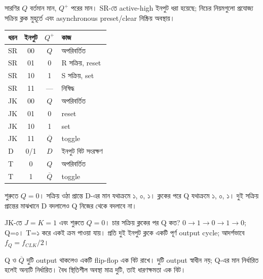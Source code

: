 সারণির $Q$ বর্তমান মান, $Q^+$ পরের মান। SR-তে active-high ইনপুট ধরা হয়েছে; নিচের নিয়মগুলো প্রযোজ্য সক্রিয় ক্লক মুহূর্তে এবং asynchronous preset/clear নিষ্ক্রিয় অবস্থায়।
\begin{center}\begin{tabularx}{\linewidth}{|l|c|c|Y|}\hline
ধরন & ইনপুট & $Q^+$ & কাজ\\\hline
SR & 00 & $Q$ & অপরিবর্তিত\\\hline
SR & 01 & 0 & R সক্রিয়, reset\\\hline
SR & 10 & 1 & S সক্রিয়, set\\\hline
SR & 11 & --- & নিষিদ্ধ\\\hline
JK & 00 & $Q$ & অপরিবর্তিত\\\hline
JK & 01 & 0 & reset\\\hline
JK & 10 & 1 & set\\\hline
JK & 11 & $\overline Q$ & toggle\\\hline
D & 0/1 & $D$ & ইনপুট বিট সংরক্ষণ\\\hline
T & 0 & $Q$ & অপরিবর্তিত\\\hline
T & 1 & $\overline Q$ & toggle\\\hline
\end{tabularx}\end{center}

শুরুতে $Q=0$। সক্রিয় ওঠা প্রান্তে D-এর মান যথাক্রমে ১, ০, ১।
\chThreeAnswer ক্লকের পরে Q যথাক্রমে ১, ০, ১। দুই সক্রিয় প্রান্তের মাঝখানে D বদলালেও Q নিজের থেকে বদলাবে না।

JK-তে $J=K=1$ এবং শুরুতে $Q=0$। চার সক্রিয় ক্লকের পর Q কত?
\chThreeAnswer $0\to1\to0\to1\to0$; Q=০। T=১ করে একই ক্রম পাওয়া যায়। প্রতি দুই ইনপুট ক্লকে একটি পূর্ণ output cycle; আদর্শভাবে $f_Q=f_{CLK}/2$।

Q ও $\overline Q$ দুটি output থাকলেও একটি flip-flop এক বিট রাখে।
\chThreeAnswer দুটি output স্বাধীন নয়; Q-এর মান নির্ধারিত হলেই অন্যটি নির্ধারিত। বৈধ স্থিতিশীল অবস্থা মাত্র দুটি, তাই ধারণক্ষমতা এক বিট।
